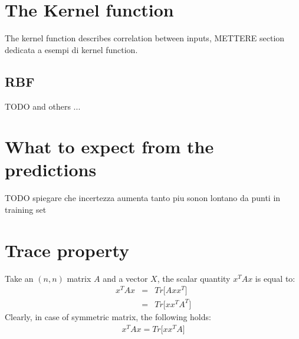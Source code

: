 \documentclass{article}
\begin{document}
\section{The Kernel function}
\label{sec:kernel_function}

The kernel function describes correlation between inputs, METTERE section dedicata a esempi di kernel function.

\subsection{RBF}

TODO and others ...

\section{What to expect from the predictions}

TODO spiegare che incertezza aumenta tanto piu sonon lontano da punti in training set

\appendix
\section{Trace property}
\label{sec:trace_property}

Take an $(n,n)$ matrix $A$ and a vector $X$, the scalar quantity $x^T A x$ is equal to:
\begin{eqnarray}
x^T A x &=& Tr \bigg [ 
A xx^T
\bigg ]
\label{eq:Tr_property}
\\
&=& Tr \bigg [ 
xx^T A^T
\bigg ]
\end{eqnarray}
Clearly, in case of symmetric matrix, the following holds:
\begin{eqnarray}
x^T A x = Tr \bigg [ 
xx^T A
\bigg ]
\end{eqnarray}
\end{document}
